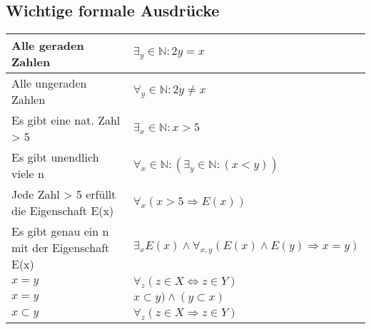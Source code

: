 \subsection{Wichtige formale Ausdrücke}
\begin{longtable}{p{}|p{}}
	Alle geraden Zahlen & \( \exists_y \in \mathbb{N}: 2y = x \)\\
	\hline
	Alle ungeraden Zahlen & \( \forall_y \in \mathbb{N}: 2y \neq x \)\\
	\hline
	Es gibt eine nat. Zahl > 5 & \(\exists_x \in \mathbb{N}: x > 5 \)\\
	\hline
	Es gibt unendlich viele n & \(\forall_x \in \mathbb{N}: (\exists_y \in \mathbb{N}: (x < y)) \)\\
	\hline
	Jede Zahl > 5 erfüllt die Eigenschaft E(x) & \(\forall_x (x > 5 \Rightarrow E(x)) \)\\
	\hline
	Es gibt genau ein n mit der Eigenschaft E(x) & \(\exists_x E(x) \wedge \forall_{x,y} (E(x) \wedge E(y) \Rightarrow x= y)\) \\
	\hline
	\(x = y\) & \(\forall_z(z \in X \Leftrightarrow z \in Y) \) \\
	\(x = y\) & \(x \subset y) \wedge (y \subset x)\) \\
	\hline
	\(x \subset y\) & \(\forall_z(z \in X \Rightarrow z \in Y) \) \\
\end{longtable}
